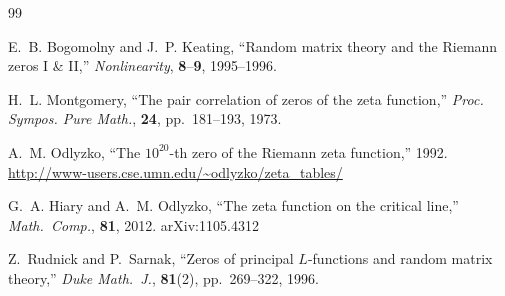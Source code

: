 \documentclass[11pt]{article}
\begin{document}
\begin{thebibliography}{99}

E.~B. Bogomolny and J.~P. Keating,
``Random matrix theory and the Riemann zeros I \& II,''
\textit{Nonlinearity}, \textbf{8}--\textbf{9}, 1995--1996.

H.~L. Montgomery,
``The pair correlation of zeros of the zeta function,''
\textit{Proc. Sympos. Pure Math.}, \textbf{24}, pp.\ 181--193, 1973.

A.~M. Odlyzko,
``The $10^{20}$-th zero of the Riemann zeta function,'' 1992.
\url{http://www-users.cse.umn.edu/~odlyzko/zeta_tables/}

G.~A. Hiary and A.~M. Odlyzko,
``The zeta function on the critical line,''
\textit{Math.\ Comp.}, \textbf{81}, 2012. arXiv:1105.4312

Z.~Rudnick and P.~Sarnak,
``Zeros of principal $L$-functions and random matrix theory,''
\textit{Duke Math.\ J.}, \textbf{81}(2), pp.\ 269--322, 1996.

\end{thebibliography}
\end{document}
